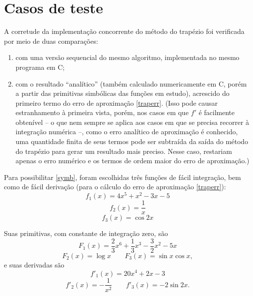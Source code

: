 \documentclass{article}
\begin{document}
  \section{Casos de teste} \label{tests}

  A corretude da implementação concorrente do método do trapézio foi verificada por meio de duas comparações:
  
  \begin{enumerate}[label=(\roman*)]
    \item com uma versão sequencial do mesmo algoritmo, implementada no mesmo programa em C; \label{seq}
    
    \item com o resultado ``analítico'' (também calculado numericamente em C, porém a partir das primitivas simbólicas das funções em estudo), acrescido do primeiro termo do erro de aproximação \eqref{traperr}. (Isso pode causar estranhamento à primeira vista, porém, nos casos em que $f'$ é facilmente obtenível -- o que nem sempre se aplica aos casos em que se precisa recorrer à integração numérica --, como o erro analítico de aproximação é conhecido, uma quantidade finita de seus termos pode ser subtraída da saída do método do trapézio para gerar um resultado mais preciso. Nesse caso, restariam apenas o erro numérico e os termos de ordem maior do erro de aproximação.) \label{symb}
  \end{enumerate}
  
  Para possibilitar \ref{symb}, foram escolhidas três funções de fácil integração, bem como de fácil derivação (para o cálculo do erro de aproximação \eqref{traperr}):
  \begin{equation} \label{f1}
   f_1(x) = 4x^5 + x^2 - 3x - 5
  \end{equation}
  \begin{equation} \label{f2}
    f_2(x) = \frac{1}{x}
  \end{equation}
  \begin{equation} \label{f3}
    f_3(x) = \cos{2x}
  \end{equation}

  Suas primitivas, com constante de integração zero, são
  \begin{equation*}
    F_1(x) = \frac{2}{3} x^6 + \frac{1}{3} x^3 - \frac{3}{2} x^2 - 5x
  \end{equation*}
  \begin{equation*}
    F_2(x) = \log{x} \qquad F_3(x) = \sin{x}\cos{x},
  \end{equation*} \noindent
  e suas derivadas são
  \begin{equation*}
    f'_1(x) = 20x^4 + 2x - 3
  \end{equation*}
  \begin{equation*}
    f'_2(x) = -\frac{1}{x^2} \qquad f'_3(x) = -2\sin{2x}.
  \end{equation*}
\end{document}
